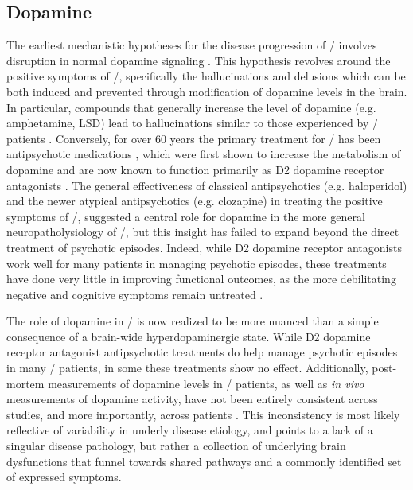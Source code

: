 

\subsection{Dopamine}
The earliest mechanistic hypotheses for the disease progression of \scz/ involves disruption in normal dopamine signaling \citep{Matthysse1973}.
This hypothesis revolves around the positive symptoms of \scz/, specifically the hallucinations and delusions which can be both induced and prevented through modification of dopamine levels in the brain.
In particular, compounds that generally increase the level of dopamine (e.g. amphetamine, LSD) lead to hallucinations similar to those experienced by \scz/ patients \citep{Angrist1994, Lieberman1987}.
Conversely, for over 60 years the primary treatment for \scz/ has been antipsychotic medications \citep{Delay1952}, which were first shown to increase the metabolism of dopamine \citep{Carlsson1963} and are now known to function primarily as D2 dopamine receptor antagonists \citep{}.
The general effectiveness of classical antipsychotics (e.g. haloperidol) and the newer atypical antipsychotics (e.g. clozapine) in treating the positive symptoms of \scz/, suggested a central role for dopamine in the more general neuropatholysiology of \scz/, but this insight has failed to expand beyond the direct treatment of psychotic episodes.
Indeed, while D2 dopamine receptor antagonists work well for many patients in managing psychotic episodes, these treatments have done very little in improving functional outcomes, as the more debilitating negative and cognitive symptoms remain untreated \citep{Insel2010}.

The role of dopamine in \scz/ is now realized to be more nuanced than a simple consequence of a brain-wide hyperdopaminergic state.
While D2 dopamine receptor antagonist antipsychotic treatments do help manage psychotic episodes in many \scz/ patients, in some these treatments show no effect.
Additionally, post-mortem measurements of dopamine levels in \scz/ patients, as well as \emph{in vivo} measurements of dopamine activity, have not been entirely consistent across studies, and more importantly, across patients \citep{}.
This inconsistency is most likely reflective of variability in underly disease etiology, and points to a lack of a singular disease pathology, but rather a collection of underlying brain dysfunctions that funnel towards shared pathways and a commonly identified set of expressed symptoms.

